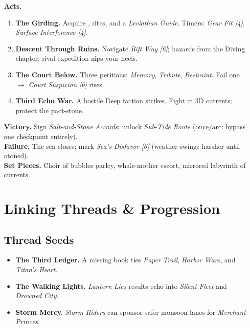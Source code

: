 \documentclass[11pt,oneside]{book}
\newcommand{\tagpill}[1]{\begingroup
  \setlength{\fboxsep}{1pt}\color{black}\fbox{\footnotesize\textsf{#1}}
\endgroup}
\begin{document}
\begin{itemize}
\textbf{Acts.}
\begin{enumerate}[leftmargin=*,itemsep=2pt]
  \item \textbf{The Girding.} Acquire \tagpill{AIRFEED}, rites, and a \emph{Leviathan Guide}. Timers: \emph{Gear Fit [4]}, \emph{Surface Interference [4]}.
  \item \textbf{Descent Through Ruins.} Navigate \emph{Rift Way [6]}; hazards from the Diving chapter; rival expedition nips your heels.
  \item \textbf{The Court Below.} Three petitions: \emph{Memory}, \emph{Tribute}, \emph{Restraint}. Fail one $\rightarrow$ \emph{Court Suspicion [6]} rises.
  \item \textbf{Third Echo War.} A hostile Deep faction strikes. Fight in 3D currents; protect the pact-stone.
\end{enumerate}

\textbf{Victory.} Sign \emph{Salt-and-Stone Accords}: unlock \emph{Sub-Tide Route} (once/arc: bypass one checkpoint entirely).\\
\textbf{Failure.} The sea closes; mark \emph{Sea's Disfavor [6]} (weather swings harsher until atoned).\\
\textbf{Set Pieces.} Choir of bubbles parley, whale-mother escort, mirrored labyrinth of currents.

\section{Linking Threads \& Progression}

\subsection*{Thread Seeds}
\begin{itemize}[leftmargin=*,itemsep=2pt]
  \item \textbf{The Third Ledger.} A missing book ties \emph{Paper Trail}, \emph{Harbor Wars}, and \emph{Titan's Heart}.
  \item \textbf{The Walking Lights.} \emph{Lantern Lies} results echo into \emph{Silent Fleet} and \emph{Drowned City}.
  \item \textbf{Storm Mercy.} \emph{Storm Riders} can sponsor safer monsoon lanes for \emph{Merchant Princes}.
\end{itemize}


\end{itemize}
\end{document}

